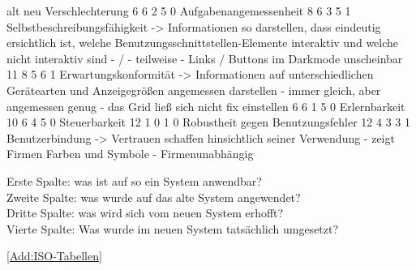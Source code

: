        alt neu Verschlechterung
6   6   2   5   0   Aufgabenangemessenheit
8   6   3   5   1   Selbstbeschreibungsfähigkeit
-> Informationen so darstellen, dass eindeutig ersichtlich ist, welche Benutzungsschnittstellen-Elemente interaktiv und welche nicht interaktiv sind - / - teilweise - Links / Buttons im Darkmode unscheinbar
11  8   5   6   1   Erwartungskonformität
-> Informationen auf unterschiedlichen Gerätearten und Anzeigegrößen angemessen darstellen - immer gleich, aber angemessen genug - das Grid ließ sich nicht fix einstellen
6   6   1   5   0   Erlernbarkeit
10  6   4   5   0   Steuerbarkeit
12  1   0   1   0   Robustheit gegen Benutzungsfehler
12  4   3   3  1   Benutzerbindung
-> Vertrauen schaffen hinsichtlich seiner Verwendung - zeigt Firmen Farben und Symbole - Firmenunabhängig

Erste Spalte: was ist auf so ein System anwendbar?\\
Zweite Spalte: was wurde auf das alte System angewendet?\\
Dritte Spalte: was wird sich vom neuen System erhofft?\\
Vierte Spalte: Was wurde im neuen System tatsächlich umgesetzt?

\autoref{Add:ISO-Tabellen}